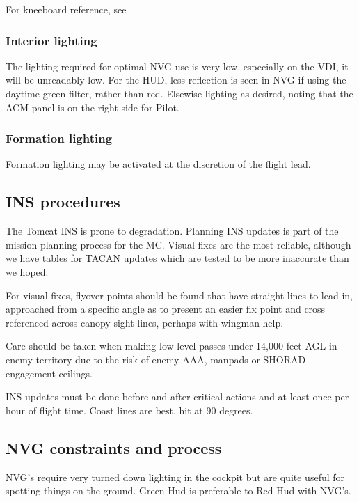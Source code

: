 For kneeboard reference, see 

\subsubsection{Interior lighting}

The lighting required for optimal NVG use is very low, especially on the VDI,
it will be unreadably low. For the HUD, less reflection is seen in NVG if using
the daytime green filter, rather than red. Elsewise lighting as desired, noting
that the ACM panel is on the right side for Pilot.

\subsubsection{Formation lighting}

Formation lighting may be activated at the discretion of the flight lead.

\newpage

\subsection{INS procedures}

The Tomcat INS is prone to degradation. Planning INS updates is part of the
mission planning process for the MC. Visual fixes are the most reliable,
although we have tables for TACAN updates which are tested to be more
inaccurate than we hoped.

For visual fixes, flyover points should be found that have straight lines to
lead in, approached from a specific angle as to present an easier fix point and
cross referenced across canopy sight lines, perhaps with wingman help.

Care should be taken when making low level passes under 14,000 feet AGL in enemy
territory due to the risk of enemy AAA, manpads or SHORAD engagement ceilings.

INS updates must be done before and after critical actions and at least once
per hour of flight time. Coast lines are best, hit at 90 degrees.

\subsection{NVG constraints and process}

NVG's require very turned down lighting in the cockpit but are quite useful for
spotting things on the ground. Green Hud is preferable to Red Hud with NVG's.

